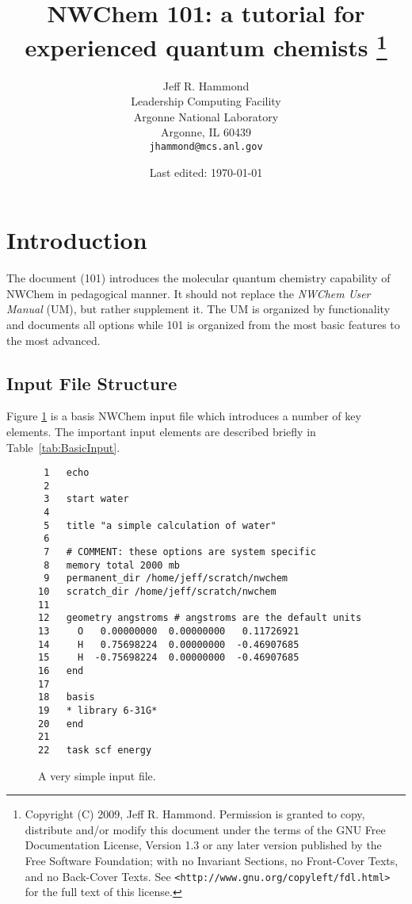 \documentclass[letterpaper,12pt]{article}
\title{NWChem 101: a tutorial for experienced quantum chemists
       \footnote{
Copyright (C) 2009, Jeff R. Hammond. Permission is granted to copy, distribute and/or modify this document under the terms of the GNU Free Documentation License, Version 1.3 or any later version published by the Free Software Foundation; with no Invariant Sections, no Front-Cover Texts, and no Back-Cover Texts. See \texttt{<http://www.gnu.org/copyleft/fdl.html>} for the full text of this license.
       }
}
\author{Jeff R. Hammond \\
        Leadership Computing Facility \\
        Argonne National Laboratory \\
        Argonne, IL 60439 \\
        \texttt{jhammond@mcs.anl.gov}}
\date{Last edited: \today}
\begin{document}
\maketitle

% 

\section{Introduction}\label{sec:Introduction}

The document (101) introduces the molecular quantum chemistry capability of NWChem in pedagogical manner.  It should not replace the \textit{NWChem User Manual} (UM), but rather supplement it.  The UM is organized by functionality and documents all options while 101 is organized from the most basic features to the most advanced.

\newpage

\subsection{Input File Structure}\label{sec:InputFileStructure}

Figure \ref{fig:WaterSimple} is a basis NWChem input file which introduces a number of key elements.  The important input elements are described briefly in Table~\ref{tab:BasicInput}.

\begin{figure}
    \caption{A very simple input file.}
    \label{fig:WaterSimple}
    \begin{verbatim}
 1   echo
 2
 3   start water
 4 
 5   title "a simple calculation of water"
 6
 7   # COMMENT: these options are system specific
 8   memory total 2000 mb
 9   permanent_dir /home/jeff/scratch/nwchem
10   scratch_dir /home/jeff/scratch/nwchem
11
12   geometry angstroms # angstroms are the default units
13     O   0.00000000  0.00000000   0.11726921
14     H   0.75698224  0.00000000  -0.46907685
15     H  -0.75698224  0.00000000  -0.46907685
16   end
17
18   basis
19   * library 6-31G*
20   end
21
22   task scf energy
    \end{verbatim}
\end{figure}
\end{document}

